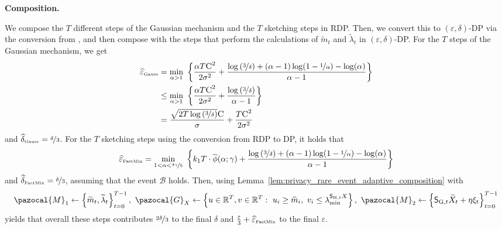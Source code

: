 \documentclass[11pt]{article}
\theoremstyle{definition}
\theoremstyle{plain}
\providecommand{\lemmaref}[1]{Lemma~\ref{#1}}
\newcommand{\reals}{\mathbb{R}}
\newcommand{\eps}{{\varepsilon}}
\newcommand{\pG}{\pazocal{G}}
\newcommand{\pM}{\pazocal{M}}
\renewcommand{\eps}{\varepsilon}
\begin{document}
\textbf{Composition.}

We compose the $T$ different steps of the Gaussian mechanism and the $T$ sketching steps in RDP. Then, we convert this to $(\eps,\delta)$-DP via the conversion from \citet{canonne2020discrete}, and then compose with the steps that perform the calculations of $\widetilde{m}_t$ and $\widetilde{\lambda}_t$ in $(\eps,\delta)$-DP. For the $T$ steps of the Gaussian mechanism, we get 
\begin{align}
    \widehat{\eps}_{\text{\tiny Gauss}} &= \underset{\alpha > 1}{\min} \ \left\{\frac{\alpha T \textsc{C}^2}{2\sigma^2} + \frac{\log\left(\nicefrac{3}{\delta}\right) + (\alpha - 1)\log(1 - \nicefrac{1}{\alpha}) - \log(\alpha)}{\alpha - 1}\right\}\\
    &\leq \underset{\alpha > 1}{\min} \ \left\{\frac{\alpha T \textsc{C}^2}{2\sigma^2} + \frac{\log\left(\nicefrac{3}{\delta}\right)}{\alpha-1}\right\}\\
    &= \frac{\sqrt{2T\log\left(\nicefrac{3}{\delta}\right)}\textsc{C}}{\sigma} + \frac{T\textsc{C}^2}{2\sigma^2}
\end{align}
and $\widehat{\delta}_{\text{\tiny Gauss}} = \nicefrac{\delta}{3}$. For the $T$ sketching steps using the conversion from RDP to DP, it holds that 
\begin{equation}
    \widehat{\eps}_{\text{\tiny FastMix}} = \underset{1 < \alpha < \nicefrac{4\gamma}{5}}{\min} \ \left\{k_1T\cdot \overline{\phi}(\alpha;\gamma) + \frac{\log\left(\nicefrac{3}{\delta}\right) + (\alpha - 1)\log(1 - \nicefrac{1}{\alpha}) - \log(\alpha)}{\alpha - 1}\right\}
\end{equation}
and $\widehat{\delta}_{\text{\tiny FastMix}} = \nicefrac{\delta}{3}$, assuming that the event $\mathcal{B}$ holds. Then, using \lemmaref{lem:privacy_rare_event_adaptive_composition} with 
\begin{align}
    \pM_1 \gets \left\{\widetilde{m}_t, \widetilde{\lambda}_t\right\}^{T-1}_{t=0}, \ \pG_X \gets \left\{u\in\reals^{T}, v\in\reals^{T}: \ u_i \geq \widehat{m}_i, \ v_i \leq \lambda^{\mathsf{S}_{\mathrm{H},t }X}_{\min}\right\}, \ \pM_2 \gets \left\{\mathsf{S}_{\mathrm{G}, t}\widetilde{X}_t + \eta \xi_t\right\}^{T-1}_{t=0}
\end{align}
yields that overall these steps contributes $\nicefrac{2\delta}{3}$ to the final $\delta$ and $\frac{\eps}{3} + \widehat{\eps}_{\text{\tiny FastMix}}$ to the final $\eps$. 
\end{document}
